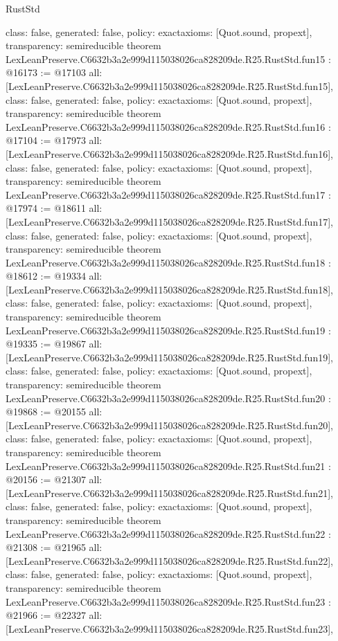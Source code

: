 \begin{lexlean}{RustStd}
\begin{coremodule}
{  class: false,
  generated: false,
  policy: exact{axioms: [Quot.sound, propext]},
  transparency: semireducible
}
theorem LexLeanPreserve.C6632b3a2e999d115038026ca828209de.R25.RustStd.fun15 : @16173 := @17103 {
  all: [LexLeanPreserve.C6632b3a2e999d115038026ca828209de.R25.RustStd.fun15],
  class: false,
  generated: false,
  policy: exact{axioms: [Quot.sound, propext]},
  transparency: semireducible
}
theorem LexLeanPreserve.C6632b3a2e999d115038026ca828209de.R25.RustStd.fun16 : @17104 := @17973 {
  all: [LexLeanPreserve.C6632b3a2e999d115038026ca828209de.R25.RustStd.fun16],
  class: false,
  generated: false,
  policy: exact{axioms: [Quot.sound, propext]},
  transparency: semireducible
}
theorem LexLeanPreserve.C6632b3a2e999d115038026ca828209de.R25.RustStd.fun17 : @17974 := @18611 {
  all: [LexLeanPreserve.C6632b3a2e999d115038026ca828209de.R25.RustStd.fun17],
  class: false,
  generated: false,
  policy: exact{axioms: [Quot.sound, propext]},
  transparency: semireducible
}
theorem LexLeanPreserve.C6632b3a2e999d115038026ca828209de.R25.RustStd.fun18 : @18612 := @19334 {
  all: [LexLeanPreserve.C6632b3a2e999d115038026ca828209de.R25.RustStd.fun18],
  class: false,
  generated: false,
  policy: exact{axioms: [Quot.sound, propext]},
  transparency: semireducible
}
theorem LexLeanPreserve.C6632b3a2e999d115038026ca828209de.R25.RustStd.fun19 : @19335 := @19867 {
  all: [LexLeanPreserve.C6632b3a2e999d115038026ca828209de.R25.RustStd.fun19],
  class: false,
  generated: false,
  policy: exact{axioms: [Quot.sound, propext]},
  transparency: semireducible
}
theorem LexLeanPreserve.C6632b3a2e999d115038026ca828209de.R25.RustStd.fun20 : @19868 := @20155 {
  all: [LexLeanPreserve.C6632b3a2e999d115038026ca828209de.R25.RustStd.fun20],
  class: false,
  generated: false,
  policy: exact{axioms: [Quot.sound, propext]},
  transparency: semireducible
}
theorem LexLeanPreserve.C6632b3a2e999d115038026ca828209de.R25.RustStd.fun21 : @20156 := @21307 {
  all: [LexLeanPreserve.C6632b3a2e999d115038026ca828209de.R25.RustStd.fun21],
  class: false,
  generated: false,
  policy: exact{axioms: [Quot.sound, propext]},
  transparency: semireducible
}
theorem LexLeanPreserve.C6632b3a2e999d115038026ca828209de.R25.RustStd.fun22 : @21308 := @21965 {
  all: [LexLeanPreserve.C6632b3a2e999d115038026ca828209de.R25.RustStd.fun22],
  class: false,
  generated: false,
  policy: exact{axioms: [Quot.sound, propext]},
  transparency: semireducible
}
theorem LexLeanPreserve.C6632b3a2e999d115038026ca828209de.R25.RustStd.fun23 : @21966 := @22327 {
  all: [LexLeanPreserve.C6632b3a2e999d115038026ca828209de.R25.RustStd.fun23],
}
\end{coremodule}
\end{lexlean}

